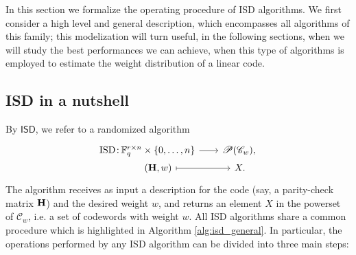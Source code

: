 In this section we formalize the operating procedure of ISD algorithms.
We first consider a high level and general description, which encompasses all algorithms of this family; this modelization will turn useful, in the following sections, when we will study the best performances we can achieve, when this type of algorithms is employed to estimate the weight distribution of a linear code.

\subsection{ISD in a nutshell}
By $\mathsf{ISD}$, we refer to a randomized algorithm
\begin{equation*}
    \functionFive{\text{ISD}}{\mathbb{F}_q^{r \times n} \times \{0,\ldots,n\}}{\mathscr{P}(\mathscr{C}_w),}{(\6H, w)}{X.}
\end{equation*}
The algorithm receives as input a description for the code (say, a parity-check matrix $\mathbf H$) and the desired weight $w$, and returns an element $X$ in the powerset of $\mathscr{C}_w$, i.e. a set of codewords with weight $w$.
All ISD algorithms share a common procedure which is highlighted in Algorithm \ref{alg:isd_general}.
In particular, the operations performed by any ISD algorithm can be divided into three main steps:
